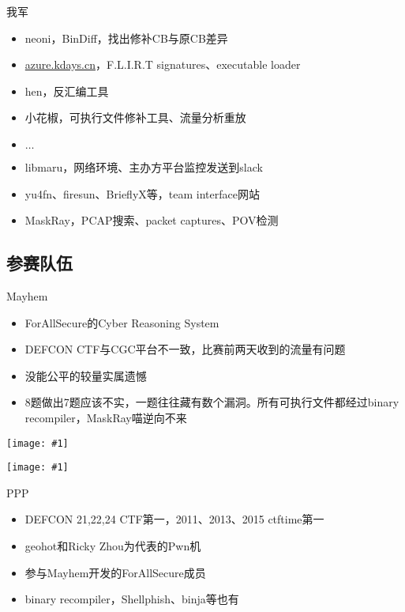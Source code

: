 \documentclass{beamer}
\newcommand{\image}[1]{
  \begin{frame}
    \texttt{[image: \#1]}
  \end{frame}
}
\begin{document}
\begin{frame}
  \begin{block}{我军}
    \begin{itemize}
      \item neoni，BinDiff，找出修补CB与原CB差异
      \item \url{azure.kdays.cn}，F.L.I.R.T signatures、executable loader
      \item hen，反汇编工具
      \item 小花椒，可执行文件修补工具、流量分析重放
      \item $\ldots$
      \item libmaru，网络环境、主办方平台监控发送到slack
      \item yu4fn、firesun、BrieflyX等，team interface网站
      \item MaskRay，PCAP搜索、packet captures、POV检测
    \end{itemize}
  \end{block}
\end{frame}

\subsection{参赛队伍}

\begin{frame}
  \begin{block}{Mayhem}
    \begin{itemize}[<+-|alert@+>]
      \item ForAllSecure的Cyber Reasoning System
      \item DEFCON CTF与CGC平台不一致，比赛前两天收到的流量有问题
      \item 没能公平的较量实属遗憾
      \item 8题做出7题应该不实，一题往往藏有数个漏洞。所有可执行文件都经过binary recompiler，MaskRay喵逆向不来
    \end{itemize}
  \end{block}
\end{frame}

\image{img/ppp.jpg}

\image{img/geohot.jpg}

\begin{frame}
  \begin{block}{PPP}
    \begin{itemize}[<+-|alert@+>]
      \item DEFCON 21,22,24 CTF第一，2011、2013、2015 ctftime第一
      \item geohot和Ricky Zhou为代表的Pwn机
      \item 参与Mayhem开发的ForAllSecure成员
      \item binary recompiler，Shellphish、binja等也有
    \end{itemize}
  \end{block}
\end{frame}
\end{document}
